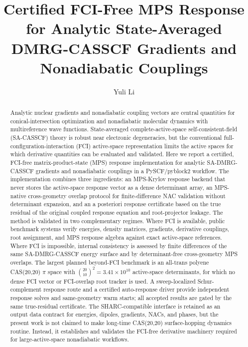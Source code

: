 \documentclass[journal=jctcce,manuscript=article]{achemso}
\title{Certified FCI-Free MPS Response for Analytic State-Averaged DMRG-CASSCF Gradients and Nonadiabatic Couplings}
\author{Yuli Li}
\affiliation[Harvard University]
{Department of Chemistry and Chemical Biology, Harvard University, Cambridge, Massachusetts 02138, United States}
\begin{document}
\begin{abstract}
Analytic nuclear gradients and nonadiabatic coupling vectors are central quantities for conical-intersection optimization and nonadiabatic molecular dynamics with multireference wave functions.
State-averaged complete-active-space self-consistent-field (SA-CASSCF) theory is robust near electronic degeneracies, but the conventional full-configuration-interaction (FCI) active-space representation limits the active spaces for which derivative quantities can be evaluated and validated.
Here we report a certified, FCI-free matrix-product-state (MPS) response implementation for analytic SA-DMRG-CASSCF gradients and nonadiabatic couplings in a PySCF/pyblock2 workflow.
The implementation combines three ingredients: an MPS-Krylov response backend that never stores the active-space response vector as a dense determinant array, an MPS-native cross-geometry overlap protocol for finite-difference NAC validation without determinant expansion, and an a posteriori response certificate based on the true residual of the original coupled response equation and root-projector leakage.
The method is validated in two complementary regimes.
Where FCI is available, public benchmark systems verify energies, density matrices, gradients, derivative couplings, root assignment, and MPS response algebra against exact active-space references.
Where FCI is impossible, internal consistency is assessed by finite differences of the same SA-DMRG-CASSCF energy surface and by determinant-free cross-geometry MPS overlaps.
The largest planned beyond-FCI benchmark is an all-trans polyene CAS(20,20) $\pi$ space with $\binom{20}{10}^{2}=3.41\times 10^{10}$ active-space determinants, for which no dense FCI vector or FCI-overlap root tracker is used.
A sweep-localized Schur-complement response route and a certified auto-response driver provide independent response solves and same-geometry warm starts; all accepted results are gated by the same true-residual certificate.
The SHARC-compatible interface is retained as an output data contract for energies, dipoles, gradients, NACs, and phases, but the present work is not claimed to make long-time CAS(20,20) surface-hopping dynamics routine.
Instead, it establishes and validates the FCI-free derivative machinery required for large-active-space nonadiabatic workflows.
\end{abstract}
\end{document}
